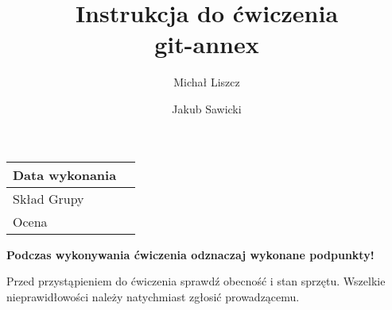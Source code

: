 \documentclass[polish]{article}
\title{\textbf{Instrukcja do ćwiczenia}\\git-annex}
\author{Michał Liszcz \and Jakub Sawicki}
\newif\ifteacher
\begin{document}
\maketitle

\ifteacher
{\centering \Large wersja dla prowadzącego

}
\else
\begin{tabular}{|l|p{}|}
\hline
Data wykonania & \\
\hline
Skład Grupy & \\
\hline
Ocena & \\
\hline
\end{tabular}

\vspace{0.5cm}
\noindent \textbf{Podczas wykonywania ćwiczenia odznaczaj wykonane podpunkty!}

\noindent Przed przystąpieniem do ćwiczenia sprawdź obecność i stan sprzętu.
Wszelkie nieprawidłowości należy natychmiast zgłosić prowadzącemu.
\fi
\vspace{0.5cm}

\renewcommand{\labelenumi}{$\Box$~\texttt{\theenumi}}
\renewcommand{\labelenumii}{$\Box$~\texttt{\theenumii}}


\end{document}
